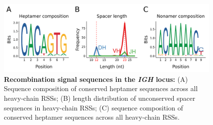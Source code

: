 	\begin{figure}
		\begin{subfigure}{0em}
        \label{fig:xma-rss-seqlogo-all-heptamer}
    \end{subfigure}
    \begin{subfigure}{0em}
        \label{fig:xma-rss-seqlogo-all-spacer}
    \end{subfigure}
    \begin{subfigure}{0em}
        \label{fig:xma-rss-seqlogo-all-nonamer}
    \end{subfigure}
	\includegraphics[width=\textwidth]{_Figures/png/xma-new-rss-seqlogo-all}
	\caption[Recombination signal sequences in the \Xma \textit{IGH} locus]{\textbf{Recombination signal sequences in the \Xma \textit{IGH} locus:} (A) Sequence composition of conserved heptamer sequences across all \Xma heavy-chain RSSs; (B) length distribution of unconserved spacer sequences in \Xma heavy-chain RSSs; (C) sequence composition of conserved heptamer sequences across all \Xma heavy-chain RSSs.}
	\label{fig:xma-rss-seqlogo-all}
	\vspace{1em}
	\end{figure}

